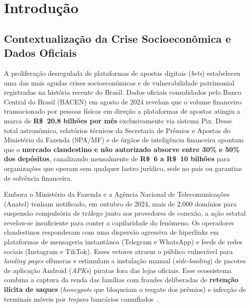 \section{Introdu\c{c}\~{a}o}
\label{sec:introducao}

\subsection{Contextualiza\c{c}\~{a}o da Crise Socioecon\^{o}mica e Dados Oficiais}

A prolifera\c{c}\~{a}o desregulada de plataformas de apostas digitais (\textit{bets}) estabeleceu uma das mais agudas crises socioecon\^{o}micas e de vulnerabilidade patrimonial registradas na hist\'{o}ria recente do Brasil. Dados oficiais consolidados pelo Banco Central do Brasil (BACEN) em agosto de 2024 revelam que o volume financeiro transacionado por pessoas f\'{i}sicas em dire\c{c}\~{a}o a plataformas de apostas atingiu a marca de \textbf{R\$~20,8 bilh\~{o}es por m\^{e}s} exclusivamente via sistema Pix. Desse total astron\^{o}mico, relat\'{o}rios t\'{e}cnicos da Secretaria de Pr\^{e}mios e Apostas do Minist\'{e}rio da Fazenda (SPA/MF) e de \'{o}rg\~{a}os de intelig\^{e}ncia financeira apontam que o \textbf{mercado clandestino e n\~{a}o autorizado absorve entre 30\% e 50\% dos dep\'{o}sitos}, canalizando mensalmente de \textbf{R\$~6 a R\$~10 bilh\~{o}es} para organiza\c{c}\~{o}es que operam sem qualquer lastro jur\'{i}dico, sede no pa\'{i}s ou garantias de solv\^{e}ncia financeira.

Embora o Minist\'{e}rio da Fazenda e a Ag\^{e}ncia Nacional de Telecomunica\c{c}\~{o}es (Anatel) tenham notificado, em outubro de 2024, mais de 2.000 dom\'{i}nios para suspens\~{a}o compuls\'{o}ria de tr\'{a}fego junto aos provedores de conex\~{a}o, a a\c{c}\~{a}o estatal revelou-se insuficiente para conter a capilaridade do fen\^{o}meno. Os operadores clandestinos responderam com uma dispers\~{a}o agressiva de hiperlinks em plataformas de mensageria instant\^{a}nea (Telegram e WhatsApp) e feeds de redes sociais (Instagram e TikTok). Esses vetores atraem o p\'{u}blico vulner\'{a}vel para \textit{landing pages} ef\^{e}meras e estimulam a instala\c{c}\~{a}o manual (\textit{side-loading}) de pacotes de aplica\c{c}\~{a}o Android (\textit{APKs}) piratas fora das lojas oficiais. Esse ecossistema combina a captura da renda das fam\'{i}lias com fraudes deliberadas de \textbf{reten\c{c}\~{a}o il\'{i}cita de saques} (\textit{honeypots} que bloqueiam o resgate dos pr\^{e}mios) e infec\c{c}\~{a}o de terminais m\'{o}veis por \textit{trojans} banc\'{a}rios camuflados~\cite{li2025automated}.

